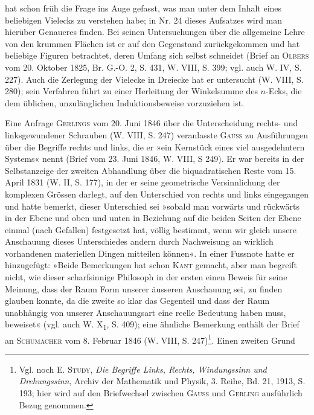 hat schon früh die Frage ins Auge gefasst, was man unter dem Inhalt eines
beliebigen Vielecks zu verstehen habe; in Nr. 24 dieses Aufsatzes wird man
hierüber Genaueres finden. Bei seinen Untersuchungen über die allgemeine
Lehre von den krummen Flächen ist er auf den Gegenstand zurückgekommen
und hat beliebige Figuren betrachtet, deren Umfang sich selbst schneidet
(Brief an \textsc{Olbers} vom 20. Oktober 1825, Br. G.-O. 2, S. 431, W. VIII, S. 399;
vgl. auch W. IV, S. 227). Auch die Zerlegung der Vielecke in Dreiecke hat
er untersucht (W. VIII, S. 280); sein Verfahren führt zu einer Herleitung der
Winkelsumme des \(n\)-Ecks, die dem üblichen, unzulänglichen Induktionsbeweise
vorzuziehen ist.
\par
Eine Anfrage \textsc{Gerlings} vom 20. Juni 1846 über die Unterscheidung rechts-
und linksgewundener Schrauben (W. VIII, S. 247) veranlasste \textsc{Gauss} zu Ausführungen
über die Begriffe rechts und links, die er »ein Kernstück eines viel
ausgedehntern Systems« nennt (Brief vom 23. Juni 1846, W. VIII, S 249).
Er war bereits in der Selbstanzeige der zweiten Abhandlung über die biquadratischen
Reste vom 15. April 1831 (W. II, S. 177), in der er seine geometrische
Versinnlichung der komplexen Grössen darlegt, auf den Unterschied
von rechts und links eingegangen und hatte bemerkt, dieser Unterschied sei
»sobald man vorwärts und rückwärts in der Ebene und oben und unten in
Beziehung auf die beiden Seiten der Ebene einmal (nach Gefallen) festgesetzt
hat,  völlig bestimmt, wenn wir gleich unsere Anschauung dieses
Unterschiedes andern  durch Nachweisung an wirklich vorhandenen materiellen
Dingen mitteilen können«. In einer Fussnote hatte er hinzugefügt:
»Beide Bemerkungen hat schon \textsc{Kant} gemacht, aber man begreift nicht, wie
dieser scharfsinnige Philosoph in der ersten einen Beweis für seine Meinung,
dass der Raum  Form unserer äusseren Anschauung sei, zu finden glauben
konnte, da die zweite so klar das Gegenteil und dass der Raum unabhängig
von unserer Anschauungsart eine reelle Bedeutung haben muss, beweiset«
(vgl. auch W. X\textsubscript{1}, S. 409); eine ähnliche Bemerkung enthält der Brief an
\clearpage{}\setcounter{footnote}{0}
\noindent \textsc{Schumacher} vom 8. Februar 1846 (W. VIII, S. 247)\footnote{Vgl. noch E. \textsc{Study}, \textit{Die Begriffe Links, Rechts, Windungssinn und Drehungssinn}, Archiv der Mathematik und Physik, 3. Reihe, Bd. 21, 1913, S. 193; hier wird auf den Briefwechsel zwischen \textsc{Gauss} und \textsc{Gerling} ausführlich Bezug genommen.}. Einen zweiten Grund
